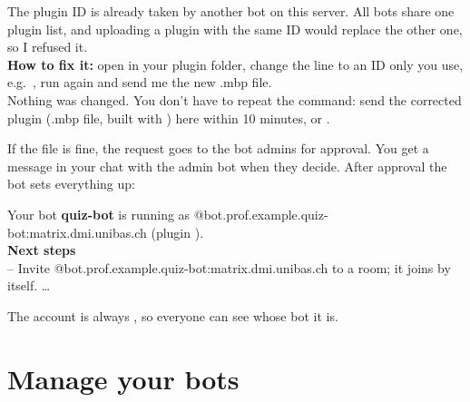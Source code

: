 \begin{botreply}
The plugin ID  is already taken by another bot on this server. All bots
share one plugin list, and uploading a plugin with the same ID would replace the other one,
so I refused it.\\
\textbf{How to fix it:} open  in your plugin folder, change the  line
to an ID only you use, e.g.\ , run  again
and send me the new .mbp file.\\[4pt]
Nothing was changed. You don't have to repeat the command: send the corrected plugin (.mbp
file, built with ) here within 10 minutes, or .
\end{botreply}

If the file is fine, the request goes to the bot admins for approval. You get a message in
your chat with the admin bot when they decide. After approval the bot sets everything up:

\begin{botreply}
Your bot \textbf{quiz-bot} is running as @bot.prof.example.quiz-bot:matrix.dmi.unibas.ch
(plugin ).\\[4pt]
\textbf{Next steps}\\
-- Invite @bot.prof.example.quiz-bot:matrix.dmi.unibas.ch to a room; it joins by itself. \dots
\end{botreply}

The account is always , so everyone can see whose bot
it is.

\section{Manage your bots}

